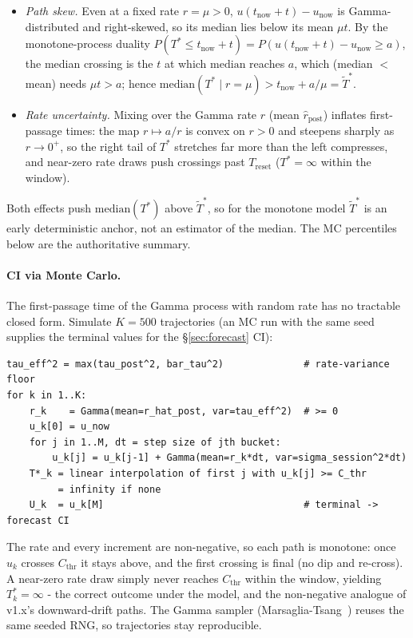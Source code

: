 \documentclass[11pt]{article}
\newcommand{\rpost}{\hat r_{\text{post}}}
\newcommand{\unow}{u_{\text{now}}}
\newcommand{\tnow}{t_{\text{now}}}
\newcommand{\Treset}{T_{\text{reset}}}
\newcommand{\Cthr}{C_{\text{thr}}}
\newcommand{\Tstar}{T^\ast}
\newcommand{\Tstark}{T^\ast_k}
\begin{document}
\begin{itemize}
  \item \emph{Path skew.} Even at a fixed rate $r = \mu > 0$, $u(\tnow+t)-\unow$
    is Gamma-distributed and right-skewed, so its median lies below its mean
    $\mu t$. By the monotone-process duality $P(\Tstar \le \tnow+t) = P(u(\tnow+t)
    - \unow \ge a)$, the median crossing is the $t$ at which $\mathrm{median}$
    reaches $a$, which (median $<$ mean) needs $\mu t > a$; hence
    $\mathrm{median}(\Tstar \mid r{=}\mu) > \tnow + a/\mu = \tilde\Tstar$.
  \item \emph{Rate uncertainty.} Mixing over the Gamma rate $r$ (mean $\rpost$)
    inflates first-passage times: the map $r \mapsto a/r$ is convex on $r > 0$
    and steepens sharply as $r \to 0^+$, so the right tail of $\Tstar$ stretches
    far more than the left compresses, and near-zero rate draws push crossings
    past $\Treset$ ($\Tstar = \infty$ within the window).
\end{itemize}

Both effects push $\mathrm{median}(\Tstar)$ above $\tilde\Tstar$, so for the
monotone model $\tilde\Tstar$ is an early deterministic anchor, not an
estimator of the median. The MC percentiles below are the authoritative
summary.

\paragraph{CI via Monte Carlo.} The first-passage time of the Gamma process
with random rate has no tractable closed form. Simulate $K = 500$ trajectories
(an MC run with the same seed supplies the terminal values for the
\S\ref{sec:forecast} CI):

\begin{lstlisting}
tau_eff^2 = max(tau_post^2, bar_tau^2)              # rate-variance floor
for k in 1..K:
    r_k    = Gamma(mean=r_hat_post, var=tau_eff^2)  # >= 0
    u_k[0] = u_now
    for j in 1..M, dt = step size of jth bucket:
        u_k[j] = u_k[j-1] + Gamma(mean=r_k*dt, var=sigma_session^2*dt)
    T*_k = linear interpolation of first j with u_k[j] >= C_thr
         = infinity if none
    U_k  = u_k[M]                                   # terminal -> forecast CI
\end{lstlisting}

The rate and every increment are non-negative, so each path is monotone: once
$u_k$ crosses $\Cthr$ it stays above, and the first crossing is final (no dip
and re-cross). A near-zero rate draw simply never reaches $\Cthr$ within the
window, yielding $\Tstark = \infty$ - the correct outcome under the model,
and the non-negative analogue of v1.x's downward-drift paths. The Gamma
sampler (Marsaglia-Tsang~\cite{marsaglia2000}) reuses the same seeded RNG, so
trajectories stay reproducible.
\end{document}
